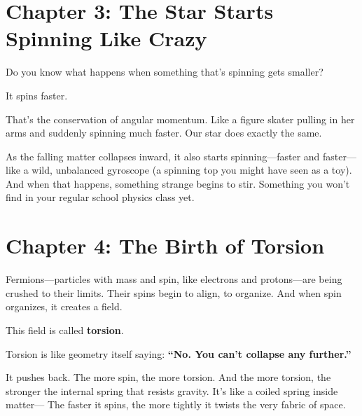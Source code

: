 \documentclass{article}
\begin{document}

\section*{Chapter 3: The Star Starts Spinning Like Crazy}

\noindent
Do you know what happens when something that’s spinning gets smaller?

\vspace{1ex}
\noindent
It spins faster.

\vspace{1ex}
\noindent
That’s the conservation of angular momentum.  
Like a figure skater pulling in her arms and suddenly spinning much faster.  
Our star does exactly the same.

\vspace{1ex}
\noindent
As the falling matter collapses inward, it also starts spinning—faster and faster—like a wild, unbalanced gyroscope (a spinning top you might have seen as a toy).  
And when that happens, something strange begins to stir.  
Something you won’t find in your regular school physics class yet.



\section*{Chapter 4: The Birth of Torsion}

\noindent
Fermions—particles with mass and spin, like electrons and protons—are being crushed to their limits.  
Their spins begin to align, to organize.  
And when spin organizes, it creates a field.

\vspace{1ex}
\noindent
This field is called \textbf{torsion}.

\vspace{1ex}
\noindent
Torsion is like geometry itself saying:  
\textbf{“No. You can’t collapse any further.”}

\vspace{1ex}
\noindent
It pushes back.  
The more spin, the more torsion.  
And the more torsion, the stronger the internal spring that resists gravity.  
It’s like a coiled spring inside matter—  
The faster it spins, the more tightly it twists the very fabric of space.
\end{document}
